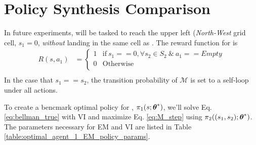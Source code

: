     \begin{figure}[htb]
        \begin{center}
        \end{center}
\end{figure}


\section{Policy Synthesis Comparison} \label{sec:em_vi_comparison}
In future experiments,  will be tasked to reach the upper left (\emph{North-West} grid cell, $s_1=0$,
\emph{without} landing in the same cell as . The reward function for  is
\begin{align*}
        R(s,a_1) & = \begin{cases}
1 & \text{if}\ s_1 == 0, \forall s_2 \in S_2\ \&\ a_1==Empty \\
0 & \text{Otherwise} \\
\end{cases} \\
\end{align*}
In the case that $s_1==s_2$, the transition probability of $\mathcal{M}$ is set to a self-loop under all actions.

To create a bencmark optimal policy for , $\pi_{1}(s;\boldsymbol{\mathbb{\theta}}^*)$, we'll solve Eq.
\ref{eq:bellman_true} with \ac{VI} and maximize Eq. \ref{eq:M_step} using $\pi_{2}((s_1,s_2);\boldsymbol{\mathbb{\theta}}^*)$.
The parameters necessary for EM and VI are listed in Table \ref{table:optimal_agent_1_EM_policy_params}.

